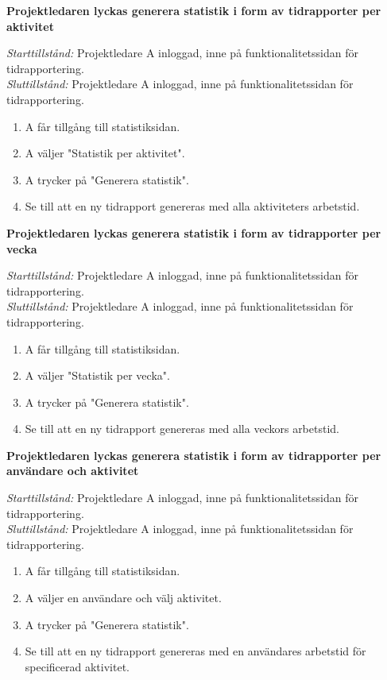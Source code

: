 \documentclass[a4paper]{article}
\begin{document}
\begin{FT}
\item
\textbf{Projektledaren lyckas generera statistik i form av tidrapporter per aktivitet}

\emph{Starttillstånd:} Projektledare A inloggad, inne på funktionalitetssidan för tidrapportering.\\
\emph{Sluttillstånd:} Projektledare A inloggad, inne på funktionalitetssidan för tidrapportering.

\begin{enumerate}
\item A får tillgång till statistiksidan.
\item A väljer "Statistik per aktivitet".
\item A trycker på "Generera statistik".
\item Se till att en ny tidrapport genereras med alla aktiviteters arbetstid.
\end{enumerate}


\item
\textbf{Projektledaren lyckas generera statistik i form av tidrapporter per vecka}

\emph{Starttillstånd:} Projektledare A inloggad, inne på funktionalitetssidan för tidrapportering.\\
\emph{Sluttillstånd:} Projektledare A inloggad, inne på funktionalitetssidan för tidrapportering.

\begin{enumerate}
\item A får tillgång till statistiksidan.
\item A väljer "Statistik per vecka".
\item A trycker på "Generera statistik".
\item Se till att en ny tidrapport genereras med alla veckors arbetstid.
\end{enumerate}


\item
\textbf{Projektledaren lyckas generera statistik i form av tidrapporter per användare och aktivitet}

\emph{Starttillstånd:} Projektledare A inloggad, inne på funktionalitetssidan för tidrapportering.\\
\emph{Sluttillstånd:} Projektledare A inloggad, inne på funktionalitetssidan för tidrapportering.

\begin{enumerate}
\item A får tillgång till statistiksidan.
\item A väljer en användare och välj aktivitet.
\item A trycker på "Generera statistik".
\item Se till att en ny tidrapport genereras med en användares arbetstid för specificerad aktivitet.
\end{enumerate}



\end{FT}
\end{document}
